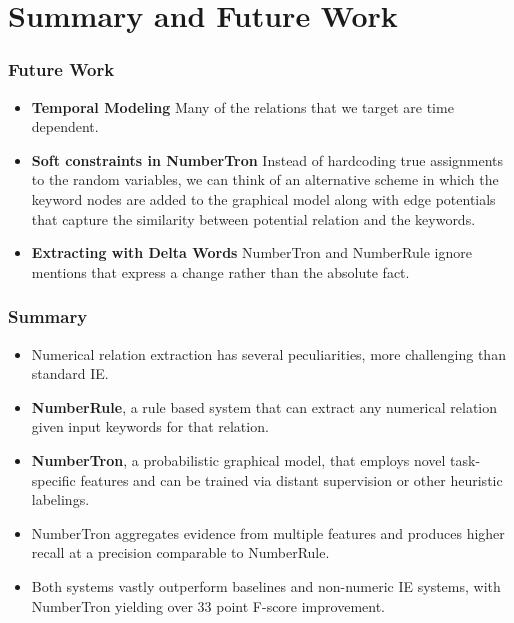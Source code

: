 \documentclass{beamer}
\begin{document}
% 

\section{Summary and Future Work}	
\begin{frame}
\frametitle{Future Work}
\begin{itemize} 
\setlength \itemsep{1em}
\item \textbf{Temporal Modeling} Many of the relations that we target are time dependent.
\item \textbf{Soft constraints in NumberTron} Instead of hardcoding true assignments to the random variables, we can think of an alternative scheme in which the keyword nodes are added to the graphical model along with edge potentials that capture the similarity between potential relation and the keywords.
\item \textbf{Extracting with Delta Words} NumberTron and NumberRule ignore mentions that express a change rather than the absolute fact.
\end{itemize}
\end{frame}

\begin{frame}
\frametitle{Summary}
\begin{itemize} 
\item  Numerical relation extraction has several peculiarities, more challenging than standard IE.
\item \textbf{NumberRule}, a rule based system that can extract any numerical relation given input keywords for that relation.
\item \textbf{NumberTron}, a probabilistic graphical model, that employs novel task-specific features and can be trained via distant supervision or other heuristic labelings. 
\item NumberTron aggregates evidence from multiple features and produces higher recall at a precision comparable to NumberRule. 
\item Both systems vastly outperform baselines and non-numeric IE systems, with NumberTron yielding over 33 point F-score improvement.
\end{itemize}
    
\end{frame}
\end{document}
